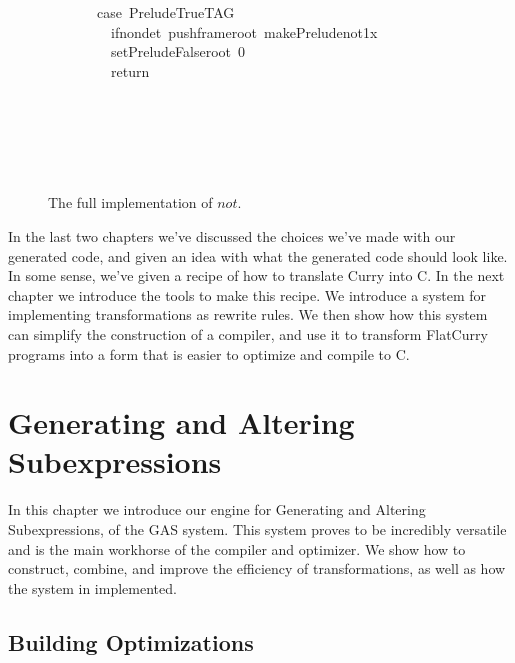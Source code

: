 \documentclass{book}
\theoremstyle{definition}
\newcommand{\Varid}[1]{\mathit{#1}}
\begin{document}
\begin{figure}
\begin{tabbing}
\ttfamily ~~~~~~~case~PreludeTrueTAG\\
\ttfamily ~~~~~~~~~ifnondet~pushframeroot~makePreludenot1x\\
\ttfamily ~~~~~~~~~setPreludeFalseroot~0\\
\ttfamily ~~~~~~~~~return\\
\ttfamily ~\\
\ttfamily ~~~~~~~\\
\ttfamily ~~~~~\\
\ttfamily ~~~\\
\ttfamily ~
\end{tabbing}
\caption{The full implementation of \ensuremath{\Varid{not}}.}
\label{fig:notFull}
\end{figure}

In the last two chapters we've discussed the choices we've made with 
our generated code, and given an idea with what the generated code should look like.
In some sense, we've given a recipe of how to translate Curry into C.
In the next chapter we introduce the tools to make this recipe.
We introduce a system for implementing transformations as rewrite rules.
We then show how this system can simplify the construction of a compiler,
and use it to transform FlatCurry programs into a form that is easier to optimize and compile to C.




\chapter{Generating and Altering Subexpressions} \label{ch:Generating and Altering Subexpressions}


In this chapter we introduce our engine for Generating and Altering Subexpressions, of the GAS system.
This system proves to be incredibly versatile and is the main workhorse of the compiler and optimizer.
We show how to construct, combine, and improve the efficiency of transformations,
as well as how the system in implemented.



\section{Building Optimizations}
\end{document}
